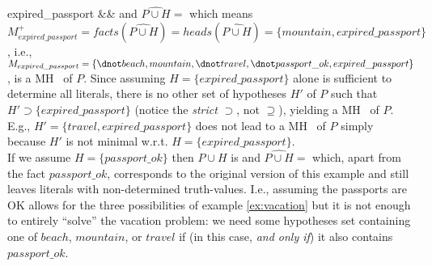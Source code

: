 \documentclass{llncs}
\begin{document}
{{{				expired\_passport &&
			}
			and $\widehat{P\cup H}=$
			which means $M_{expired\_passport}^+=facts(\widehat{P\cup H})=heads(\widehat{P\cup H})=\{mountain,expired\_passport\}$, i.e., \\
			$M_{expired\_passport}=\{\dnot beach,mountain,\dnot travel, \dnot passport\_ok,expired\_passport\}$, is a MH \m\ of $P$.
Since assuming $H=\{expired\_passport\}$ alone is sufficient to determine all literals, there is no other set of hypotheses $H'$ of $P$
			such that $H'\supset\{expired\_passport\}$ (notice the \emph{strict} $\supset$, not $\supseteq$), yielding a MH \m\ of $P$.
			E.g., $H'=\{travel,expired\_passport\}$ does not lead to a MH \m\ of $P$ simply because $H'$ is not minimal w.r.t.
			$H=\{expired\_passport\}$.\\			
			If we assume $H=\{passport\_ok\}$ then $P\cup H$ is
			and $\widehat{P\cup H}=$
			which, apart from the fact $passport\_ok$, corresponds to the original version of this example and still leaves literals with non-determined
			truth-values.
			I.e., assuming the passports are OK allows for the three possibilities of example \ref{ex:vacation} but it is not enough to entirely ``solve''
			the vacation problem: we need some hypotheses set containing one of $beach$, $mountain$, or $travel$ if (in this case, 
			\emph{and only if}) it also contains $passport\_ok$.
		}
		}
			
\end{document}
